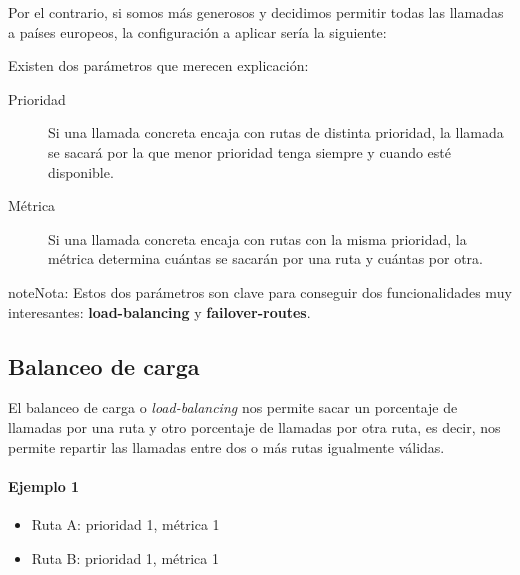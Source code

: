 \documentclass[letterpaper,10pt,spanish]{sphinxmanual}
\begin{document}
Por el contrario, si somos más generosos y decidimos permitir todas las llamadas a países europeos, la configuración a aplicar sería la siguiente:

\label{external_outgoing_calls/call_routing:routes-metrics}
Existen dos parámetros que merecen explicación:
\begin{description}
\item[{Prioridad}] \leavevmode{}\label{external_outgoing_calls/call_routing:term-priority}
Si una llamada concreta encaja con rutas de distinta prioridad, la llamada se sacará por la que menor prioridad tenga siempre y cuando esté disponible.

\item[{Métrica}] \leavevmode{}\label{external_outgoing_calls/call_routing:term-metric}
Si una llamada concreta encaja con rutas con la misma prioridad, la métrica determina cuántas se sacarán por una ruta y cuántas por otra.

\end{description}

\begin{notice}{note}{Nota:}
Estos dos parámetros son clave para conseguir dos funcionalidades muy interesantes: \textbf{load-balancing} y \textbf{failover-routes}.
\end{notice}


\subsection{Balanceo de carga}
\label{external_outgoing_calls/call_routing:load-balancing}
El balanceo de carga o \emph{load-balancing} nos permite sacar un porcentaje de llamadas por una ruta y otro porcentaje de llamadas por otra ruta, es decir, nos permite repartir las llamadas entre dos o más rutas igualmente válidas.
\paragraph{Ejemplo 1}
\begin{itemize}
\item {} 
Ruta A: prioridad 1, métrica 1

\item {} 
Ruta B: prioridad 1, métrica 1

\end{itemize}
\end{document}
